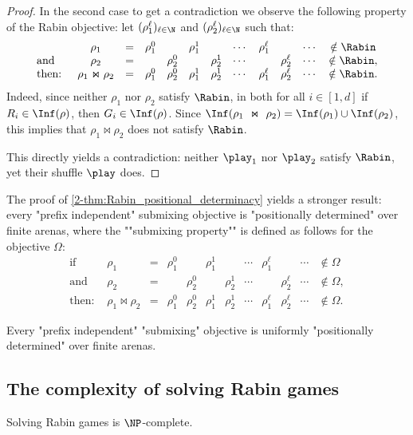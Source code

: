 \begin{proof}
In the second case to get a contradiction we observe the following property of the Rabin objective:
let $(\rho_1^\ell)_{\ell \in \N}$ and $(\rho_2^\ell)_{\ell \in \N}$ such that:
\[
\begin{array}{lccccccccccc}
& \rho_1 & = & \rho_1^0 & & \rho_1^1 & & \cdots & \rho_1^\ell & & \cdots & \notin \Rabin \\
\text{and} & \rho_2 & = & & \rho_2^0 & & \rho_2^1 & \cdots & & \rho_2^\ell & \cdots & \notin \Rabin, \\ 
\text{then: } & \rho_1 \Join \rho_2 & = & \rho_1^0 & \rho_2^0 & \rho_1^1 & \rho_2^1 & \cdots & \rho_1^\ell & \rho_2^\ell & \cdots & \notin \Rabin.
\end{array}
\]
Indeed, since neither $\rho_1$ nor $\rho_2$ satisfy $\Rabin$, in both for all $i \in [1,d]$ if $R_i \in \Inf(\rho)$, then $G_i \in \Inf(\rho)$.
Since $\Inf(\rho_1~\Join~\rho_2) = \Inf(\rho_1) \cup \Inf(\rho_2)$, this implies that $\rho_1 \Join \rho_2$ does not satisfy $\Rabin$.

This directly yields a contradiction: neither $\play_1$ nor $\play_2$ satisfy $\Rabin$, yet their shuffle $\play$ does.
\end{proof}

The proof of \cref{2-thm:Rabin_positional_determinacy} yields a stronger result: every "prefix independent" submixing objective is "positionally determined" over finite arenas, where the ""submixing property"" is defined as follows for the objective $\Omega$:
\[
\begin{array}{lccccccccccc}
\text{if} & \rho_1 & = & \rho_1^0 & & \rho_1^1 & & \cdots & \rho_1^\ell & & \cdots & \notin \Omega \\
\text{and} & \rho_2 & = & & \rho_2^0 & & \rho_2^1 & \cdots & & \rho_2^\ell & \cdots & \notin \Omega, \\ 
\text{then: } & \rho_1 \Join \rho_2 & = & \rho_1^0 & \rho_2^0 & \rho_1^1 & \rho_2^1 & \cdots & \rho_1^\ell & \rho_2^\ell & \cdots & \notin \Omega.
\end{array}
\]

\begin{theorem}
\label{2-thm:submixing_positional}
Every "prefix independent" "submixing" objective is uniformly "positionally determined" over finite arenas.
\end{theorem}

\subsection*{The complexity of solving Rabin games}
\begin{theorem}
\label{2-thm:Rabin_complexity}
Solving Rabin games is $\NP$-complete.
\end{theorem}


